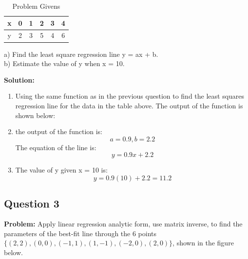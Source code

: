 \documentclass[a4paper,12pt]{article}
\begin{document}
\begin{table}[H]
    \centering
    \begin{tabular}{|c|c|c|c|c|c|}
        \hline
        x & 0 & 1 & 2 & 3 & 4 \\
        \hline
        y & 2 & 3 & 5 & 4 & 6 \\
        \hline
    \end{tabular}
    \caption{Problem Givens}
    \label{tab:xy_values}
\end{table}

a) Find the least square regression line y = ax + b.\\

b) Estimate the value of y when x = 10.

\textbf{Solution:}
\begin{enumerate}
    \item Using the same function as in the previous question to find the least squares regression line for the data in the table above. The output of the function is shown below:
    \item the output of the function is:
    \[
    a = 0.9, b = 2.2
    \]
    The equation of the line is:
    \[
    y = 0.9x + 2.2
    \]
    \item The value of y given x = 10 is:
    \[
    y = 0.9(10) + 2.2 = 11.2
    \]
\end{enumerate}
\newpage

\subsection{Question 3}
\textbf{Problem:} 
Apply linear regression analytic form, use matrix inverse, to find the parameters of the best-fit line through the 6 points \(\{(2,2), (0,0), (-1,1), (1,-1), (-2,0), (2,0)\}\), shown in the figure below.
\end{document}
